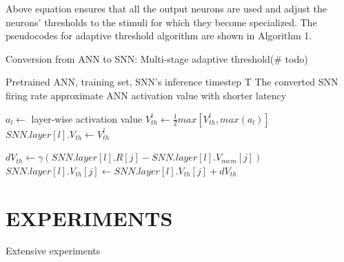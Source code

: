 \documentclass{article}
\begin{document}
Above equation ensures that all the output neurons are used and adjust the neurons’ thresholds to the
stimuli for which they become specialized.
The pseudocodes for adaptive threshold algorithm are shown in Algorithm 1.
\begin{algorithm}[h] 
	\caption{Conversion from ANN to SNN: Multi-stage adaptive threshold(\# todo)} 
	\begin{algorithmic}[1] 
		\Require 
    Pretrained ANN, training set,  SNN's inference timestep T
		\Ensure 
		The converted SNN firing rate approximate ANN activation value with shorter latency

      \State $a_l \gets$ layer-wise activation value
        \State $V_{th}^l \gets \frac{1}{2}max[V_{th}^l, max(a_l)]$
        \State $SNN.layer[l].V_{th} \gets V_{th}^l$
      \EndFor
    \EndFor

          \State $dV_{th} \gets \gamma(SNN.layer[l].R[j] - SNN.layer[l].V_{mem}[j])$
          \State $SNN.layer[l].V_{th}[j] \gets SNN.layer[l].V_{th}[j] + dV_{th}$
        \EndFor
      \EndFor
    \EndFor

	\end{algorithmic} 
\end{algorithm}




\section{EXPERIMENTS}


Extensive experiments 
\end{document}
